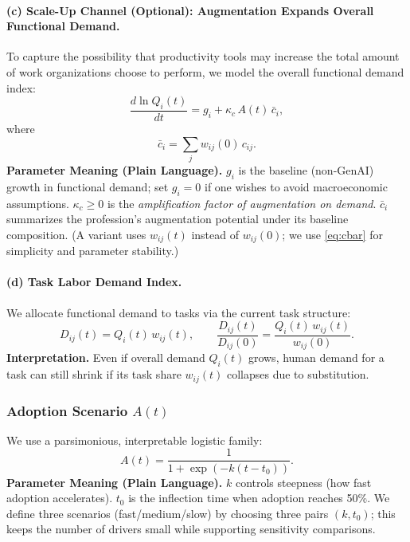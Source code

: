 \paragraph{(c) Scale-Up Channel (Optional): Augmentation Expands Overall Functional Demand.}
To capture the possibility that productivity tools may increase the total amount of work organizations choose to perform, we model the overall functional demand index:
\begin{equation}
\label{eq:Q_ode}
\frac{d \ln Q_i(t)}{dt} = g_i + \kappa_c\,A(t)\,\bar c_i,
\end{equation}
where
\begin{equation}
\label{eq:cbar}
\bar c_i = \sum_{j} w_{ij}(0)\,c_{ij}.
\end{equation}
\noindent\textbf{Parameter Meaning (Plain Language).} $g_i$ is the baseline (non-GenAI) growth in functional demand; set $g_i=0$ if one wishes to avoid macroeconomic assumptions. $\kappa_c\ge 0$ is the \emph{amplification factor of augmentation on demand}. $\bar c_i$ summarizes the profession's augmentation potential under its baseline composition. (A variant uses $w_{ij}(t)$ instead of $w_{ij}(0)$; we use \eqref{eq:cbar} for simplicity and parameter stability.)

\paragraph{(d) Task Labor Demand Index.}
We allocate functional demand to tasks via the current task structure:
\begin{equation}
\label{eq:D_def}
D_{ij}(t) = Q_i(t)\,w_{ij}(t),
\qquad
\frac{D_{ij}(t)}{D_{ij}(0)}=\frac{Q_i(t)\,w_{ij}(t)}{w_{ij}(0)}.
\end{equation}
\noindent\textbf{Interpretation.} Even if overall demand $Q_i(t)$ grows, human demand for a task can still shrink if its task share $w_{ij}(t)$ collapses due to substitution.

\subsubsection{Adoption Scenario $A(t)$}
\label{sec:adoption}
We use a parsimonious, interpretable logistic family:
\begin{equation}
\label{eq:adoption_logistic}
A(t) = \frac{1}{1+\exp\!\left(-k(t-t_0)\right)}.
\end{equation}
\noindent\textbf{Parameter Meaning (Plain Language).} $k$ controls steepness (how fast adoption accelerates). $t_0$ is the inflection time when adoption reaches 50\%. We define three scenarios (fast/medium/slow) by choosing three pairs $(k,t_0)$; this keeps the number of drivers small while supporting sensitivity comparisons.

